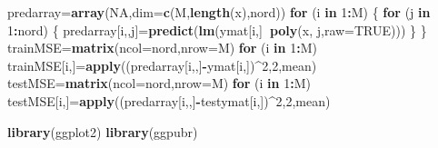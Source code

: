 \documentclass[]{article}
\newenvironment{Shaded}{\begin{snugshade}}{\end{snugshade}}
\newcommand{\ControlFlowTok}[1]{\textcolor[rgb]{0.13,0.29,0.53}{\textbf{#1}}}
\newcommand{\DataTypeTok}[1]{\textcolor[rgb]{0.13,0.29,0.53}{#1}}
\newcommand{\DecValTok}[1]{\textcolor[rgb]{0.00,0.00,0.81}{#1}}
\newcommand{\KeywordTok}[1]{\textcolor[rgb]{0.13,0.29,0.53}{\textbf{#1}}}
\newcommand{\NormalTok}[1]{#1}
\newcommand{\OperatorTok}[1]{\textcolor[rgb]{0.81,0.36,0.00}{\textbf{#1}}}
\newcommand{\OtherTok}[1]{\textcolor[rgb]{0.56,0.35,0.01}{#1}}
\begin{document}
\begin{Shaded}
\begin{Highlighting}[]
\NormalTok{predarray=}\KeywordTok{array}\NormalTok{(}\OtherTok{NA}\NormalTok{,}\DataTypeTok{dim=}\KeywordTok{c}\NormalTok{(M,}\KeywordTok{length}\NormalTok{(x),nord))}
\ControlFlowTok{for}\NormalTok{ (i }\ControlFlowTok{in} \DecValTok{1}\OperatorTok{:}\NormalTok{M)}
\NormalTok{\{}
  \ControlFlowTok{for}\NormalTok{ (j }\ControlFlowTok{in} \DecValTok{1}\OperatorTok{:}\NormalTok{nord)}
\NormalTok{  \{}
\NormalTok{    predarray[i,,j]=}\KeywordTok{predict}\NormalTok{(}\KeywordTok{lm}\NormalTok{(ymat[i,]}\OperatorTok{~}\KeywordTok{poly}\NormalTok{(x, j,}\DataTypeTok{raw=}\OtherTok{TRUE}\NormalTok{)))}
\NormalTok{  \}}
\NormalTok{\}  }
\NormalTok{trainMSE=}\KeywordTok{matrix}\NormalTok{(}\DataTypeTok{ncol=}\NormalTok{nord,}\DataTypeTok{nrow=}\NormalTok{M)}
\ControlFlowTok{for}\NormalTok{ (i }\ControlFlowTok{in} \DecValTok{1}\OperatorTok{:}\NormalTok{M) trainMSE[i,]=}\KeywordTok{apply}\NormalTok{((predarray[i,,]}\OperatorTok{-}\NormalTok{ymat[i,])}\OperatorTok{^}\DecValTok{2}\NormalTok{,}\DecValTok{2}\NormalTok{,mean)}
\NormalTok{testMSE=}\KeywordTok{matrix}\NormalTok{(}\DataTypeTok{ncol=}\NormalTok{nord,}\DataTypeTok{nrow=}\NormalTok{M)}
\ControlFlowTok{for}\NormalTok{ (i }\ControlFlowTok{in} \DecValTok{1}\OperatorTok{:}\NormalTok{M) testMSE[i,]=}\KeywordTok{apply}\NormalTok{((predarray[i,,]}\OperatorTok{-}\NormalTok{testymat[i,])}\OperatorTok{^}\DecValTok{2}\NormalTok{,}\DecValTok{2}\NormalTok{,mean)}

\KeywordTok{library}\NormalTok{(ggplot2)}
\KeywordTok{library}\NormalTok{(ggpubr)}


\end{Highlighting}
\end{Shaded}
\end{document}

